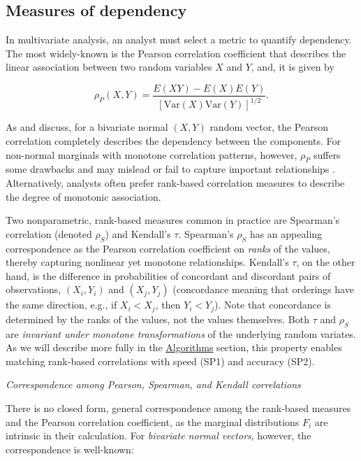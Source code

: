 \documentclass[
]{jss}
\begin{document}
\hypertarget{measures-of-dependency}{%
\subsection{Measures of dependency}\label{measures-of-dependency}}

In multivariate analysis, an analyst must select a metric to quantify dependency. The most widely-known is the Pearson correlation coefficient that describes the linear association between two random variables \(X\) and \(Y\), and, it is given by

\begin{equation}
\rho_P(X,Y) = \frac{E(XY) - E(X)E(Y)}{\left[ \mathrm{Var}(X)\mathrm{Var}(Y)\right]^{1/2}}.
\label{eq:pearson}
\end{equation}

As \citet{MB13} and \citet{MK01} discuss, for a bivariate normal \((X,Y)\) random vector, the Pearson correlation completely describes the dependency between the components. For non-normal marginals with monotone correlation patterns, however, \(\rho_P\) suffers some drawbacks and may mislead or fail to capture important relationships \citep{MK01}. Alternatively, analysts often prefer rank-based correlation measures to describe the degree of monotonic association.

Two nonparametric, rank-based measures common in practice are Spearman's correlation (denoted \(\rho_S\)) and Kendall's \(\tau\). Spearman's \(\rho_S\) has an appealing correspondence as the Pearson correlation coefficient on \emph{ranks} of the values, thereby capturing nonlinear yet monotone relationships. Kendall's \(\tau\), on the other hand, is the difference in probabilities of concordant and discordant pairs of observations, \((X_i, Y_i)\) and \((X_j, Y_j)\) (concordance meaning that orderings have the same direction, e.g., if \(X_i < X_j\), then \(Y_i < Y_j\)). Note that concordance is determined by the ranks of the values, not the values themselves. Both \(\tau\) and \(\rho_S\) are \emph{invariant under monotone transformations} of the underlying random variates. As we will describe more fully in the \protect\hyperlink{algorithms}{Algorithms} section, this property enables matching rank-based correlations with speed (SP1) and accuracy (SP2).

\emph{Correspondence among Pearson, Spearman, and Kendall correlations}

There is no closed form, general correspondence among the rank-based measures and the Pearson correlation coefficient, as the marginal distributions \(F_i\) are intrinsic in their calculation. For \emph{bivariate normal vectors}, however, the correspondence is well-known:
\end{document}
